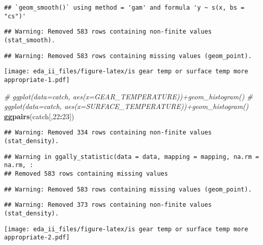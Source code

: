 \documentclass[
]{article}
\newenvironment{Shaded}{\begin{snugshade}}{\end{snugshade}}
\newcommand{\CommentTok}[1]{\textcolor[rgb]{0.56,0.35,0.01}{\textit{#1}}}
\newcommand{\DecValTok}[1]{\textcolor[rgb]{0.00,0.00,0.81}{#1}}
\newcommand{\KeywordTok}[1]{\textcolor[rgb]{0.13,0.29,0.53}{\textbf{#1}}}
\newcommand{\NormalTok}[1]{#1}
\newcommand{\OperatorTok}[1]{\textcolor[rgb]{0.81,0.36,0.00}{\textbf{#1}}}
\newcommand{\StringTok}[1]{\textcolor[rgb]{0.31,0.60,0.02}{#1}}
\begin{document}
\begin{verbatim}
## `geom_smooth()` using method = 'gam' and formula 'y ~ s(x, bs = "cs")'
\end{verbatim}

\begin{verbatim}
## Warning: Removed 583 rows containing non-finite values (stat_smooth).
\end{verbatim}

\begin{verbatim}
## Warning: Removed 583 rows containing missing values (geom_point).
\end{verbatim}

\texttt{[image: eda\_ii\_files/figure-latex/is gear temp or surface temp more appropriate-1.pdf]}

\begin{Shaded}
\begin{Highlighting}[]
\CommentTok{# ggplot(data=catch, aes(x=GEAR_TEMPERATURE))+geom_histogram()}
\CommentTok{# ggplot(data=catch, aes(x=SURFACE_TEMPERATURE))+geom_histogram()}
\KeywordTok{ggpairs}\NormalTok{(catch[,}\DecValTok{22}\OperatorTok{:}\DecValTok{23}\NormalTok{])}
\end{Highlighting}
\end{Shaded}

\begin{verbatim}
## Warning: Removed 334 rows containing non-finite values (stat_density).
\end{verbatim}

\begin{verbatim}
## Warning in ggally_statistic(data = data, mapping = mapping, na.rm = na.rm, :
## Removed 583 rows containing missing values
\end{verbatim}

\begin{verbatim}
## Warning: Removed 583 rows containing missing values (geom_point).
\end{verbatim}

\begin{verbatim}
## Warning: Removed 373 rows containing non-finite values (stat_density).
\end{verbatim}

\texttt{[image: eda\_ii\_files/figure-latex/is gear temp or surface temp more appropriate-2.pdf]}

\begin{Shaded}
\end{Shaded}
\end{document}
